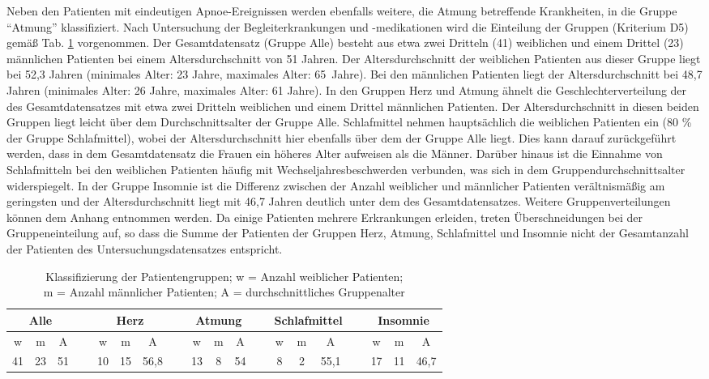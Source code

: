 Neben den Patienten mit eindeutigen Apnoe-Ereignissen werden ebenfalls weitere, die Atmung betreffende Krankheiten, in die Gruppe "`Atmung"' klassifiziert. Nach Untersuchung der Begleiterkrankungen und -medikationen wird die Einteilung der Gruppen (Kriterium D5) gemäß Tab. \ref{tab:gruppen} vorgenommen. Der Gesamtdatensatz (Gruppe Alle) besteht aus etwa zwei Dritteln (41) weiblichen und einem Drittel (23) männlichen Patienten bei einem Altersdurchschnitt von 51 Jahren. Der Altersdurchschnitt der weiblichen Patienten aus dieser Gruppe liegt bei 52,3 Jahren (minimales Alter: 23 Jahre, maximales Alter: 65~Jahre). Bei den männlichen Patienten liegt der Altersdurchschnitt bei 48,7 Jahren (minimales Alter: 26 Jahre, maximales Alter: 61 Jahre). In den Gruppen Herz und Atmung ähnelt die Geschlechterverteilung der des Gesamtdatensatzes mit etwa zwei Dritteln weiblichen und einem Drittel männlichen Patienten. Der Altersdurchschnitt in diesen beiden Gruppen liegt leicht über dem Durchschnittsalter der Gruppe Alle. Schlafmittel nehmen hauptsächlich die weiblichen Patienten ein (80 \% der Gruppe Schlafmittel), wobei der Altersdurchschnitt hier ebenfalls über dem der Gruppe Alle liegt. Dies kann darauf zurückgeführt werden, dass in dem Gesamtdatensatz die Frauen ein höheres Alter aufweisen als die Männer. Darüber hinaus ist die Einnahme von Schlafmitteln bei den weiblichen Patienten häufig mit Wechseljahresbeschwerden verbunden, was sich in dem Gruppendurchschnittsalter widerspiegelt. In der Gruppe Insomnie ist die Differenz zwischen der Anzahl weiblicher und männlicher Patienten verältnismäßig am geringsten und der Altersdurchschnitt liegt mit 46,7 Jahren deutlich unter dem des Gesamtdatensatzes. Weitere Gruppenverteilungen können dem Anhang entnommen werden. Da einige Patienten mehrere Erkrankungen erleiden, treten Überschneidungen bei der Gruppeneinteilung auf, so dass die Summe der Patienten der Gruppen Herz, Atmung, Schlafmittel und Insomnie nicht der Gesamtanzahl der Patienten des Untersuchungsdatensatzes entspricht.\\

\begin{table}[H] 
\centering
\begin{tabularx}{\textwidth}{ccccccccccccccccccc}
\toprule
\multicolumn{3}{c}{\textbf{Alle}} & &  \multicolumn{3}{c}{\textbf{Herz}} & &  \multicolumn{3}{c}{\textbf{Atmung}} & &  \multicolumn{3}{c}{\textbf{Schlafmittel}} & &  \multicolumn{3}{c}{\textbf{Insomnie}}\\  
\midrule
w  & m  & A  &   & w  & m  & A    &   & w  & m & A  &   & w & m & A    &   & w  & m  & A\\
41 & 23 & 51 & ~ & 10 & 15 & 56,8 & ~ & 13 & 8 & 54 & ~ & 8 & 2 & 55,1 & ~ & 17 & 11 & 46,7\\
\bottomrule
\end{tabularx}
\caption[Klassifizierung der Patientengruppen]{Klassifizierung der Patientengruppen; w = Anzahl weiblicher Patienten;\\m = Anzahl männlicher Patienten; A = durchschnittliches Gruppenalter}
\label{tab:gruppen}
\end{table}


